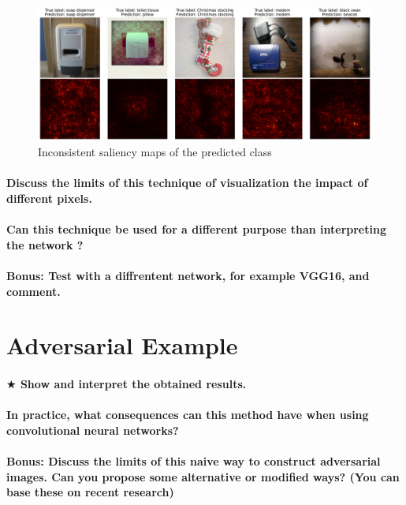 \begin{figure}[H]
    \centering
    \includegraphics[width=.95\textwidth]{figs/2b/bad_saliency_map.pdf}
    \caption{Inconsistent saliency maps of the predicted class}
    \label{fig:bad_saliency_map}
\end{figure}


\paragraph*{Discuss the limits of this technique of visualization the impact of different pixels.}
\paragraph*{Can this technique be used for a different purpose than interpreting the network ?}
\paragraph*{\textbf{Bonus:} Test with a diffrentent network, for example VGG16, and comment.}



\section{Adversarial Example}
\paragraph*{$ \bigstar $ Show and interpret the obtained results.}
\paragraph*{In practice, what consequences can this method have when using convolutional neural networks?}
\paragraph*{\textbf{Bonus:} Discuss the limits of this naive way to construct adversarial images. Can you propose some alternative or modiﬁed ways? (You can base these on recent research)}


